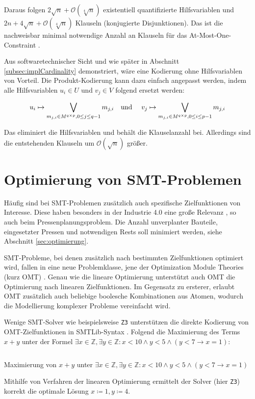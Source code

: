 Daraus folgen $2 \sqrt{n} + \mathcal{O}(\sqrt[4]{n})$ existentiell quantifizierte Hilfsvariablen und $2n + 4\sqrt{n} + \mathcal{O}(\sqrt[4]{n})$ Klauseln (konjugierte Disjunktionen).
Das ist die nachweisbar minimal notwendige Anzahl an Klauseln für das At-Most-One-Constraint \cite{amoChen, lowerBoundAMO}.

Aus softwaretechnischer Sicht und wie später in Abschnitt \ref{subsec:implCardinality} demonstriert, wäre eine Kodierung ohne Hilfsvariablen von Vorteil.
Die Produkt-Kodierung kann dazu einfach angepasst werden, indem alle Hilfsvariablen $u_i \in U$ und $v_j \in V$ folgend ersetzt werden:

\[
    u_i \mapsto \bigvee_{m_{j,i} \in M^{q \times p}, 0 \leq j \leq q-1} m_{j,i} \text{\quad und \quad}
    v_j \mapsto \bigvee_{m_{j,i} \in M^{q \times p}, 0 \leq i \leq p-1} m_{j,i}
\]

Das eliminiert die Hilfsvariablen und behält die Klauselanzahl bei.
Allerdings sind die entstehenden Klauseln um $\mathcal{O}(\sqrt{n})$ größer.

\section{Optimierung von SMT-Problemen}
Häufig sind bei SMT-Problemen zusätzlich auch spezifische Zielfunktionen von Interesse.
Diese haben besonders in der Industrie 4.0 eine große Relevanz \cite{omt}, so auch beim Pressenplanungsproblem.
Die Anzahl unverplanter Bauteile, eingesetzter Pressen und notwendigen Rests soll minimiert werden, siehe Abschnitt \ref{sec:optimierung}.

SMT-Probleme, bei denen zusätzlich nach bestimmten Zielfunktionen optimiert wird, fallen in eine neue Problemklasse,
jene der Optimization Module Theories (kurz \gls{OMT}) \cite{omt}.
Genau wie die lineare Optimierung unterstützt auch OMT die Optimierung nach linearen Zielfunktionen.
Im Gegensatz zu ersterer, erlaubt OMT zusätzlich auch beliebige boolesche Kombinationen aus Atomen, wodurch die Modellierung komplexer Probleme vereinfacht wird.

Wenige SMT-Solver wie beispielsweise \texttt{Z3} unterstützen die direkte Kodierung von OMT-Zielfunktionen in SMTLib-Syntax \cite{nuz3}.
Folgend die Maximierung des Terms $x + y$ unter der Formel $\exists x \in \mathbb{Z}, \exists y \in \mathbb{Z}: x < 10 \land y < 5 \land (y < 7 \rightarrow x = 1)$:

\begin{listing}[H]
    \inputminted[linenos=true]{bash}{Code/SMT/OMTSimple.smt2}
    \caption{Maximierung von $x + y$ unter $\exists x \in \mathbb{Z}, \exists y \in \mathbb{Z}: x < 10 \land y < 5 \land (y < 7 \rightarrow x = 1)$}
    \label{listing:omtsimple}
\end{listing}

Mithilfe von Verfahren der linearen Optimierung ermittelt der Solver (hier \texttt{Z3}) korrekt die optimale Lösung $x \coloneqq 1, y \coloneqq 4$.